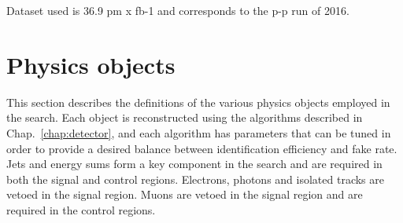 Dataset used is 36.9 pm x fb-1 and corresponds to the p-p run of 2016.

\section{Physics objects}
\label{analysis-physicsobjects}

This section describes the definitions of the various physics objects employed 
in the search. Each object is reconstructed using the algorithms described in 
Chap.~\ref{chap:detector}, and each algorithm has parameters that can be tuned 
in order to provide a desired balance between identification efficiency and 
fake rate. Jets and energy sums form a key component in the search and are 
required in both the signal and control regions. Electrons, photons and 
isolated tracks are vetoed in the signal region. Muons are vetoed in the signal 
region and are required in the control regions.


